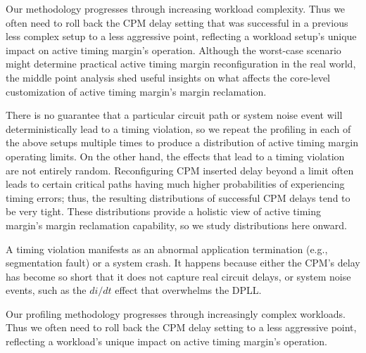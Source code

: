Our methodology progresses through increasing workload complexity. Thus we often need to roll back the CPM delay setting that was successful in a previous less complex setup to a less aggressive point, reflecting a workload setup's unique impact on active timing margin's operation. Although the worst-case scenario might determine practical active timing margin reconfiguration in the real world, the middle point analysis shed useful insights on what affects the core-level customization of active timing margin's margin reclamation.

There is no guarantee that a particular circuit path or system noise event will deterministically lead to a timing violation, so we repeat the profiling in each of the above setups multiple times to produce a distribution of active timing margin operating limits. On the other hand, the effects that lead to a timing violation are not entirely random. Reconfiguring CPM inserted delay beyond a limit often leads to certain critical paths having much higher probabilities of experiencing timing errors; thus, the resulting distributions of successful CPM delays tend to be very tight. These distributions provide a holistic view of active timing margin's margin reclamation capability, so we study distributions here onward.

A timing violation manifests as an abnormal application termination (e.g., segmentation fault) or a system crash. It happens because either the CPM's delay has become so short that it does not capture real circuit delays, or system noise events, such as the $di/dt$ effect that overwhelms the DPLL.

Our profiling methodology progresses through increasingly complex workloads. Thus we often need to roll back the CPM delay setting to a less aggressive point, reflecting a workload's unique impact on active timing margin's operation.

